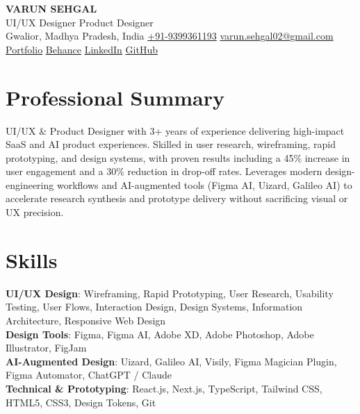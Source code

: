 \documentclass[letterpaper,10.5pt]{article}
\newcommand{\myUnderline}[1]{%
  \begingroup
  \color{underlineColor}%
  \underline{\hypersetup{linkcolor=underlineColor}#1}%
  \endgroup
}
\begin{document}
\begin{center}
    {\Large \textbf{VARUN SEHGAL}} \\ \vspace{3pt}
    \small UI/UX Designer \textbar{} Product Designer \\ \vspace{2pt}
    \small Gwalior, Madhya Pradesh, India \quad
    \href{tel:+919399361193}{+91-9399361193} \quad
    \href{mailto:varun.sehgal02@gmail.com}{varun.sehgal02@gmail.com} \\ \vspace{3pt}
    \small
    \myUnderline{\href{https://varunsehgal.runs-on.dev}{Portfolio}} \quad
    \myUnderline{\href{https://www.behance.net/varunsehgal3}{Behance}} \quad
    \myUnderline{\href{https://www.linkedin.com/in/varunsehgal02}{LinkedIn}} \quad
    \myUnderline{\href{https://github.com/varunsehgal05}{GitHub}}
\end{center}

\vspace{-6pt}

\section{Professional Summary}
\small{UI/UX \& Product Designer with 3+ years of experience delivering high-impact SaaS and AI product experiences. Skilled in user research, wireframing, rapid prototyping, and design systems, with proven results including a 45\% increase in user engagement and a 30\% reduction in drop-off rates. Leverages modern design-engineering workflows and AI-augmented tools (Figma AI, Uizard, Galileo AI) to accelerate research synthesis and prototype delivery without sacrificing visual or UX precision.}

\section{Skills}
\begin{itemize}[leftmargin=0.15in, label={}]
  \small{\item{
    \textbf{UI/UX Design}{: Wireframing, Rapid Prototyping, User Research, Usability Testing, User Flows, Interaction Design, Design Systems, Information Architecture, Responsive Web Design} \\
    \textbf{Design Tools}{: Figma, Figma AI, Adobe XD, Adobe Photoshop, Adobe Illustrator, FigJam} \\
    \textbf{AI-Augmented Design}{: Uizard, Galileo AI, Visily, Figma Magician Plugin, Figma Automator, ChatGPT / Claude} \\
    \textbf{Technical \& Prototyping}{: React.js, Next.js, TypeScript, Tailwind CSS, HTML5, CSS3, Design Tokens, Git}
  }}
\end{itemize}
\end{document}
